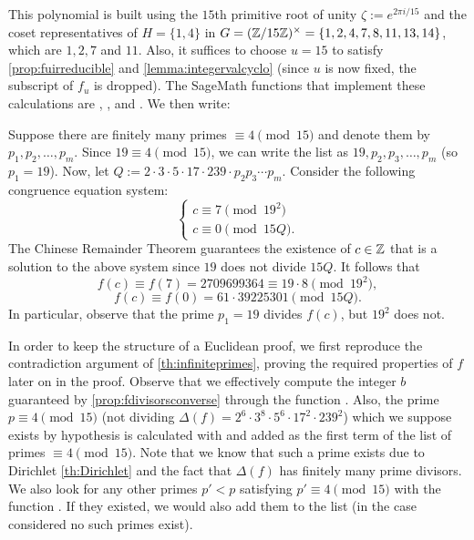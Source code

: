 \documentclass[../main.tex]{subfiles}
\begin{document}
This polynomial is built using the $15$th primitive root of unity $\zeta:=e^{2\pi i/15}$ and the coset representatives of $H=\{1,4\}$ in $G=(\mathbb{Z}/15\mathbb{Z})^\times=\{1,2,4,7,8,11,13,\allowbreak 14\}$, which are $1,2,7$ and $11$. Also, it suffices to choose $u=15$ to satisfy \cref{prop:fuirreducible} and \cref{lemma:integervalcyclo} (since $u$ is now fixed, the subscript of $f_u$ is dropped). The SageMath functions that implement these calculations are \textcolor{blue}{}, \textcolor{blue}{}, \textcolor{blue}{} and \textcolor{blue}{}. We then write:\\

 \begin{mdframed}\small
	Suppose there are finitely many primes $\equiv 4\pmod{15}$ and denote them by $p_1, p_2,\dots,p_m$. Since $19 \equiv 4 \pmod{15}$, we can write the list as $19, p_{2},p_{3},\dots, p_m$ (so $p_{1}=19$). Now, let $Q:={2 \cdot 3 \cdot 5 \cdot 17 \cdot 239}\cdot p_{2}p_{3}\cdots p_m$. Consider the following congruence equation system:
	\begin{equation*}
		\begin{cases}      
			c\equiv 7\pmod{19^2}\\
			c\equiv 0\pmod{15Q}.
		\end{cases}
	\end{equation*}
	The Chinese Remainder Theorem guarantees the existence of $c\in\mathbb{Z}$ that is a solution to the above system since $19$ does not divide $15Q$. It follows that 
	\begin{equation*}
		f(c)\equiv f(7)=2709699364\equiv 19\cdot8\pmod{19^2},
	\end{equation*}
	\begin{equation*}
		f(c)\equiv f(0)=61 \cdot 39225301\pmod{15Q}.
	\end{equation*}
	In particular, observe that the prime $p_{1}=19$ divides $f(c)$, but $19^2$ does not.
\end{mdframed}

 In order to keep the structure of a Euclidean proof, we first reproduce the contradiction argument of \cref{th:infiniteprimes}, proving the required properties of $f$ later on in the proof. Observe that we effectively compute the integer $b$ guaranteed by \cref{prop:fdivisorsconverse} through the function \textcolor{blue}{}. Also, the prime $p\equiv 4\pmod{15}$ (not dividing $\Delta(f)=2^{6} \cdot 3^{8} \cdot 5^{6} \cdot 17^{2} \cdot 239^{2}$) which we suppose exists by hypothesis is calculated with \textcolor{blue}{} and added as the first term of the list of primes $\equiv 4 \pmod{15}$. Note that we know that such a prime exists due to Dirichlet \cref{th:Dirichlet} and the fact that $\Delta(f)$ has finitely many prime divisors. We also look for any other primes $p'<p$ satisfying $p'\equiv 4 \pmod{15}$ with the function \textcolor{blue}{}. If they existed, we would also add them to the list (in the case considered no such primes exist). 
 
\end{document}
